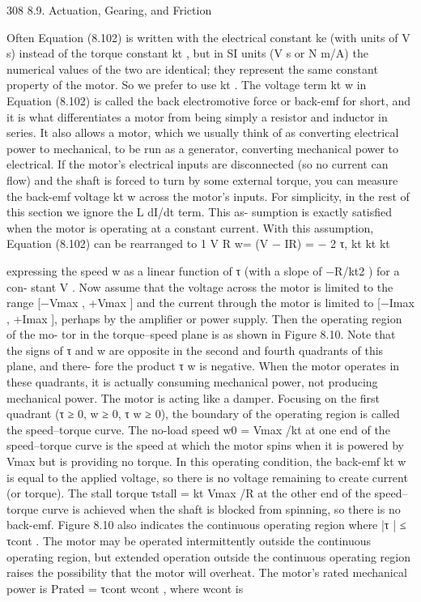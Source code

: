 \documentclass[12pt,a4paper]{article}
\begin{document}
308                                                      8.9. Actuation, Gearing, and Friction

Often Equation (8.102) is written with the electrical constant ke (with units
of V s) instead of the torque constant kt , but in SI units (V s or N m/A) the
numerical values of the two are identical; they represent the same constant
property of the motor. So we prefer to use kt .
    The voltage term kt w in Equation (8.102) is called the back electromotive
force or back-emf for short, and it is what differentiates a motor from being
simply a resistor and inductor in series. It also allows a motor, which we usually
think of as converting electrical power to mechanical, to be run as a generator,
converting mechanical power to electrical. If the motor’s electrical inputs are
disconnected (so no current can flow) and the shaft is forced to turn by some
external torque, you can measure the back-emf voltage kt w across the motor’s
inputs.
    For simplicity, in the rest of this section we ignore the L dI/dt term. This as-
sumption is exactly satisfied when the motor is operating at a constant current.
With this assumption, Equation (8.102) can be rearranged to
                                       1             V    R
                                w=        (V − IR) =    − 2 τ,
                                       kt            kt  kt

expressing the speed w as a linear function of τ (with a slope of −R/kt2 ) for a con-
stant V . Now assume that the voltage across the motor is limited to the range
[−Vmax , +Vmax ] and the current through the motor is limited to [−Imax , +Imax ],
perhaps by the amplifier or power supply. Then the operating region of the mo-
tor in the torque–speed plane is as shown in Figure 8.10. Note that the signs of τ
and w are opposite in the second and fourth quadrants of this plane, and there-
fore the product τ w is negative. When the motor operates in these quadrants,
it is actually consuming mechanical power, not producing mechanical power.
The motor is acting like a damper.
    Focusing on the first quadrant (τ ≥ 0, w ≥ 0, τ w ≥ 0), the boundary of
the operating region is called the speed–torque curve. The no-load speed
w0 = Vmax /kt at one end of the speed–torque curve is the speed at which
the motor spins when it is powered by Vmax but is providing no torque. In
this operating condition, the back-emf kt w is equal to the applied voltage, so
there is no voltage remaining to create current (or torque). The stall torque
τstall = kt Vmax /R at the other end of the speed–torque curve is achieved when
the shaft is blocked from spinning, so there is no back-emf.
    Figure 8.10 also indicates the continuous operating region where |τ | ≤ τcont .
The motor may be operated intermittently outside the continuous operating
region, but extended operation outside the continuous operating region raises
the possibility that the motor will overheat.
    The motor’s rated mechanical power is Prated = τcont wcont , where wcont is
\end{document}
